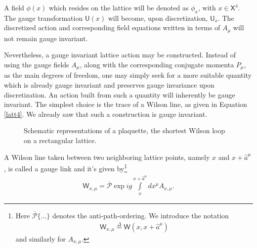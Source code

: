 A field $\phi(x)$ which resides on the lattice will be denoted as $\phi_x$, with $x\in\textsf{X}^4$. The gauge transformation $\textsf{U}(x)$ will become, upon discretization, $\textsf{U}_x$. The discretized action and corresponding field equations written in terms of $A_\mu$ will not remain gauge invariant.

Nevertheless, a gauge invariant lattice action may be constructed. Instead of using the gauge fields $A_\mu$, along with the corresponding conjugate momenta $P_\mu$, as the main degrees of freedom, one may simply seek for a more suitable quantity which is already gauge invariant and preserves gauge invariance upon discretization. An action built from such a quantity will inherently be gauge invariant. The simplest choice is the trace of a Wilson line, as given in Equation \cref{latt4}. We already saw that such a construction is gauge invariant.

\begin{figure}
    \centering
    \qquad
    \caption{Schematic representations of a plaquette, the shortest Wilson loop on a rectangular lattice.}%
    \label{fig:plaquettes}%
\end{figure}



A Wilson line taken between two neighboring lattice points, namely $x$ and $x+\hat{a}^{\mu}$, is called a {\sffamily\color{maincolor}gauge link} and it's given by\footnote{Here $\overline{\mathcal{P}}\{\ldots\}$ denotes the anti-path-ordering. We introduce the notation
\begin{align*}
    \textsf{W}_{x,\mu}\overset{\Delta}{=}\textsf{W}(x,x+\hat{a}^{\mu})
\end{align*}
and similarly for $A_{x,\mu}$.
}
\begin{align*}
    \textsf{W}_{x, \mu}=\overline{\mathcal{P}} \exp{i g \int\limits_{x}^{x+\hat{a}^{\mu}} d x^{\mu} A_{x,\mu}}.
\end{align*}

